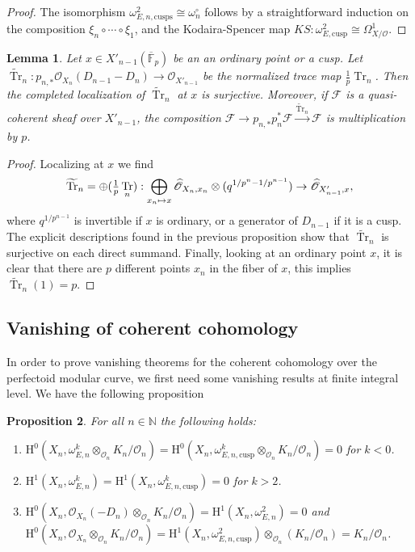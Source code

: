 \documentclass[JEP,XML,SOM,Unicode,published]{cedram}
\newcommand\mto{\mathchoice{\longmapsto}{\mapsto}{\mapsto}{\mapsto}}
\newcommand{\cusp}{\mathrm{cusp}}
\newcommand{\cusps}{\mathrm{cusps}}
\numberwithin{equation}{section}
\newtheorem{prop}{Proposition}[section]
\newtheorem{lem}[prop]{Lemma}
\theoremstyle{definition}
\newcommand{\bb}[1]{\mathbb{#1}}
\newcommand{\n}[1]{\mathcal{#1}}
\newcommand{\s}[1]{\mathscr{#1}}
\DeclareMathOperator{\Tr}{Tr}
\begin{document}
\begin{proof}
The isomorphism $\omega_{E,n,\cusps}^2\cong \omega_n^\circ$ follows by a straightforward induction on the composition $\xi_n\circ \cdots \circ \xi_{1}$, and the Kodaira-Spencer map $KS: \omega_{E,\cusp}^2\cong \Omega^1_{X/\n{O}}$.
\end{proof}

\begin{lem}
\label{LemmaSurjTrace}
Let $x\in X'_{n-1}(\overline{\bb{F}}_p)$ be an an ordinary point or a cusp. Let $\widetilde{\Tr}_n: p_{n,*}\s{O}_{X_n}(D_{n-1}-D_n)\to \s{O}_{X'_{n-1}}$ be the normalized trace map $\frac{1}{p} \Tr_n$. Then the completed localization of $\widetilde{\Tr}_n$ at $x$ is surjective. Moreover, if $\n{F}$ is a quasi-coherent sheaf over $X'_{n-1}$, the composition $\n{F}\to p_{n,*}p_n^*\n{F}\xrightarrow{\widetilde{\Tr}_n} \n{F}$ is multiplication by $p$.
\end{lem}

\begin{proof}
Localizing at $x$ we find
\[
\widetilde{\Tr}_n= \oplus (\tfrac{1}{p}\Tr_n):\bigoplus_{x_n\mto x} \widehat{\s{O}}_{X_n, x_n}\otimes (q^{1/p^n-1/p^{n-1}}) \to \widehat{\s{O}}_{X'_{n-1}, x},
\]
where $q^{1/p^{n-1}}$ is invertible if $x$ is ordinary, or a generator of $D_{n-1}$ if it is a cusp. The explicit descriptions found in the previous proposition show that $\widetilde{\Tr}_n$ is surjective on each direct summand. Finally, looking at an ordinary point $x$, it is clear that there are $p$ different points $x_n$ in the fiber of $x$, this implies $\widetilde{\Tr}_n(1)=p$.
\end{proof}

\subsection*{Vanishing of coherent cohomology}

In order to prove vanishing theorems for the coherent cohomology over the perfectoid modular curve, we first need some vanishing results at finite integral level. We have the following proposition

\begin{prop}
\label{vanishingNeg}
For all $n\in \bb{N}$ the following holds:

\begin{enumerate}
\item\label{vanishingNeg1} $\mathrm{H}^0(X_n,\omega_{E,n}^k\otimes_{\n{O}_n} K_n/\n{O}_n)=\mathrm{H}^0(X_n, \omega^k_{E,n,\cusp}\otimes_{\n{O}_n} K_n/\n{O}_n)=0$ for $k<0$.

\item\label{vanishingNeg2} $\mathrm{H}^1(X_n,\omega_{E,n}^k)=\mathrm{H}^1(X_n, \omega^k_{E,n,\cusp})=0$ for $k>2$.

\item\label{vanishingNeg3} $\mathrm{H}^0(X_n, \s{O}_{X_n}(-D_n)\otimes_{\n{O}_n} K_n/\n{O}_n)=\mathrm{H}^1(X_n,\omega^2_{E,n})=0$ and $\mathrm{H}^0(X_n, \s{O}_{X_n}\otimes_{\n{O}_n} K_n/\n{O}_n)= \mathrm{H}^1(X_n, \omega^2_{E,n,\cusp})\otimes_{\n{O}_n} (K_n/\n{O}_n)= K_n/\n{O}_n$.
\end{enumerate}
\end{prop}
\end{document}
